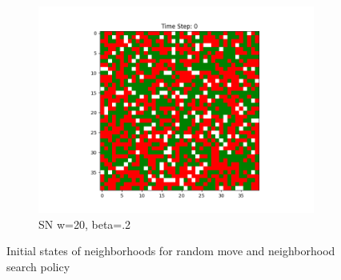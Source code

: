 \documentclass[11pt]{article}
\begin{document}
\begin{figure}[h]
\begin{subfigure}{0.14\textwidth}
			\includegraphics[width=\linewidth]{initial_cluster_w20b20.png}
			\caption{\centering SN w=20, beta=.2}
		\end{subfigure}
		\caption{Initial states of neighborhoods for random move and neighborhood search policy}
	\end{figure}
	\vspace{-2em} %
\end{document}
